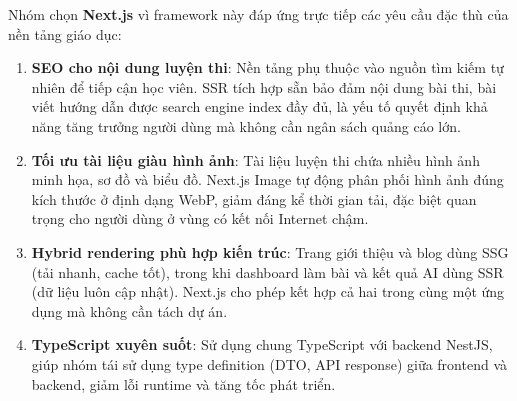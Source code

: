 \begin{table}[H]
\centering
{}
\caption{So sánh frontend framework theo yêu cầu dự án}
\end{table}

Nhóm chọn \textbf{Next.js} vì framework này đáp ứng trực tiếp các yêu cầu đặc thù của nền tảng giáo dục:

\begin{enumerate}
\item \textbf{SEO cho nội dung luyện thi}: Nền tảng phụ thuộc vào nguồn tìm kiếm tự nhiên để tiếp cận học viên. SSR tích hợp sẵn bảo đảm nội dung bài thi, bài viết hướng dẫn được search engine index đầy đủ, là yếu tố quyết định khả năng tăng trưởng người dùng mà không cần ngân sách quảng cáo lớn.

\item \textbf{Tối ưu tài liệu giàu hình ảnh}: Tài liệu luyện thi chứa nhiều hình ảnh minh họa, sơ đồ và biểu đồ. Next.js Image tự động phân phối hình ảnh đúng kích thước ở định dạng WebP, giảm đáng kể thời gian tải, đặc biệt quan trọng cho người dùng ở vùng có kết nối Internet chậm.

\item \textbf{Hybrid rendering phù hợp kiến trúc}: Trang giới thiệu và blog dùng SSG (tải nhanh, cache tốt), trong khi dashboard làm bài và kết quả AI dùng SSR (dữ liệu luôn cập nhật). Next.js cho phép kết hợp cả hai trong cùng một ứng dụng mà không cần tách dự án.

\item \textbf{TypeScript xuyên suốt}: Sử dụng chung TypeScript với backend NestJS, giúp nhóm tái sử dụng type definition (DTO, API response) giữa frontend và backend, giảm lỗi runtime và tăng tốc phát triển.
\end{enumerate}

